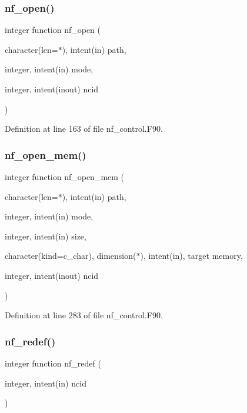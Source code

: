 \subsubsection{\texorpdfstring{nf\+\_\+open()}{nf\_open()}}
{\footnotesize\ttfamily integer function nf\+\_\+open (\begin{DoxyParamCaption}\item[{character(len=$\ast$), intent(in)}]{path,  }\item[{integer, intent(in)}]{mode,  }\item[{integer, intent(inout)}]{ncid }\end{DoxyParamCaption})}



Definition at line 163 of file nf\+\_\+control.\+F90.

\mbox{\label{nf__control_8F90_a81f7e5c1ad55e0a054ec6606ab2c9ff7}} 
\subsubsection{\texorpdfstring{nf\+\_\+open\+\_\+mem()}{nf\_open\_mem()}}
{\footnotesize\ttfamily integer function nf\+\_\+open\+\_\+mem (\begin{DoxyParamCaption}\item[{character(len=$\ast$), intent(in)}]{path,  }\item[{integer, intent(in)}]{mode,  }\item[{integer, intent(in)}]{size,  }\item[{character(kind=c\+\_\+char), dimension($\ast$), intent(in), target}]{memory,  }\item[{integer, intent(inout)}]{ncid }\end{DoxyParamCaption})}



Definition at line 283 of file nf\+\_\+control.\+F90.

\mbox{\label{nf__control_8F90_a6196fc91b24b5fb1749004aa029c7fd1}} 
\subsubsection{\texorpdfstring{nf\+\_\+redef()}{nf\_redef()}}
{\footnotesize\ttfamily integer function nf\+\_\+redef (\begin{DoxyParamCaption}\item[{integer, intent(in)}]{ncid }\end{DoxyParamCaption})}




